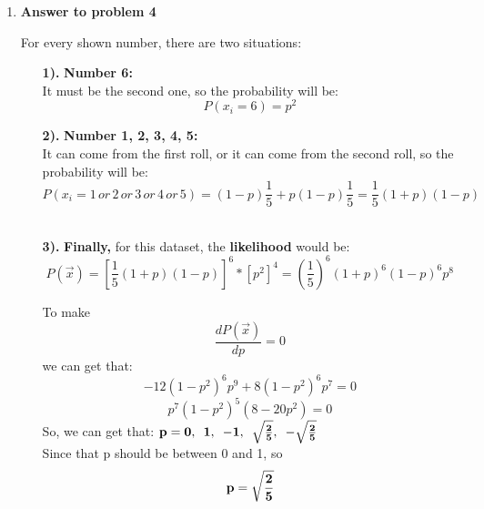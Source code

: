 \begin{enumerate}
\begin{enumerate}
{\bf So, we can get that:}
$$\bf \alpha_1 = \frac{\sum_i y_i a_i}{n \sum_i y_i}$$
$$\bf \beta_1 = \frac{\sum_i y_i b_i}{n \sum_i y_i}$$
$$\bf \gamma_1 = \frac{\sum_i y_i c_i}{n \sum_i y_i}$$\\

In the similar way, we can calculate the value of $\alpha_0, \enspace \beta_0, \enspace and \enspace \gamma_0$. We just need to replace $y_i$ in the above analysis to $1-y_i$, then, we will got the value of $\alpha_0, \enspace \beta_0, \enspace and \enspace \gamma_0$.\\

{\bf So, the final result is: }

$$\bf \alpha_0 = \frac{\sum_i (1-y_i) a_i}{n \sum_i (1-y_i)}$$
$$\bf \beta_0 = \frac{\sum_i (1-y_i) b_i}{n \sum_i (1-y_i)}$$
$$\bf \gamma_0 = \frac{\sum_i (1-y_i) c_i}{n \sum_i (1-y_i)}$$\\

\end{enumerate}

\item {\bf Answer to problem 4}

For every shown number, there are two situations:
\begin{enumerate}
\item[\bf 1). ]
{\bf Number 6:}\\
It must be the second one, so the probability will be:\\
$$P(x_i = 6) = p^2$$

\item[\bf 2). ]
{\bf Number 1, 2, 3, 4, 5:}\\
It can come from the first roll, or it can come from the second roll, so the probability will be:\\
$$P(x_i = 1\, or \, 2\, or \,3\, or \,4\, or \,5) = (1-p)\frac{1}{5} + p(1-p)\frac{1}{5} = \frac{1}{5}(1+p)(1-p)$$\\

\item[\bf 3). ] {\bf Finally, }
for this dataset, the {\bf likelihood} would be:
$$P(\vec{x}) = [\frac{1}{5}(1+p)(1-p)]^6 * [p^2]^4 = (\frac{1}{5})^6(1+p)^6(1-p)^6p^8$$

To make $$\frac{d P(\vec{x})}{d p} = 0$$
we can get that:
$$ -12(1-p^2)^6p^9 + 8(1-p^2)^6p^7 = 0$$
$$ p^7(1-p^2)^5(8-20p^2) = 0$$
So, we can get that: ${\bf p = 0, \enspace 1, \enspace -1, \enspace \sqrt{\frac{2}{5}}, \enspace  - \sqrt{\frac{2}{5}}}$\\

Since that p should be between 0 and 1, so $${\bf p = \sqrt{\frac{2}{5}}}$$


\end{enumerate}


\end{enumerate}



